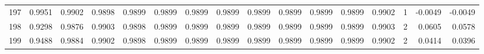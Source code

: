 \begin{tabular}{lrrrrrrrrrrrrrrr}
197 &      0.9951 &  0.9902 &  0.9898 &  0.9899 &  0.9899 &  0.9899 &  0.9899 &  0.9899 &  0.9899 &  0.9899 &   0.9899 &     0.9902 &      1 &                   -0.0049 &                    -0.0049 \\
198 &      0.9298 &  0.9876 &  0.9903 &  0.9898 &  0.9899 &  0.9899 &  0.9899 &  0.9899 &  0.9899 &  0.9899 &   0.9899 &     0.9903 &      2 &                    0.0605 &                     0.0578 \\
199 &      0.9488 &  0.9884 &  0.9902 &  0.9898 &  0.9899 &  0.9899 &  0.9899 &  0.9899 &  0.9899 &  0.9899 &   0.9899 &     0.9902 &      2 &                    0.0414 &                     0.0396 \\
\bottomrule
\end{tabular}
